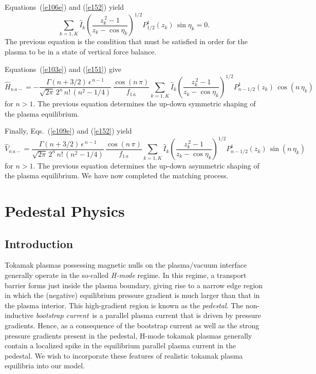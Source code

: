 \documentclass[12pt,prb,aps]{revtex4-1}
\begin{document}
Equations~(\ref{e106e}) and (\ref{e152}) yield
\begin{equation}\label{e165}
\sum_{k=1,K} 
\hat{I}_k\left(\frac{z_k^{\,2}-1}{z_k-\cos\eta_k}\right)^{1/2}P_{1/2}^1(z_k)\,\sin\eta_k=0.
\end{equation}
The previous equation is the condition that must be satisfied in order for the plasma to be in a state of vertical force balance. 

Equations~(\ref{e103e}) and (\ref{e151}) give
\begin{equation}\label{e166q}
\hat{H}_{n\,a-} = -\frac{\Gamma(n+3/2)\,\epsilon^{\,n-1}}{\sqrt{2\pi}\,2^n\,n!\,(n^2-1/4)}\,
\frac{\cos(n\,\pi)}{f_{1\,a}}\sum_{k=1,K}\hat{I}_k\left(\frac{z_k^{\,2}-1}{z_k-\cos\eta_k}\right)^{1/2}P_{n-1/2}^1(z_k)\,\cos(n\,\eta_k)
\end{equation}
for $n>1$. The previous equation determines the up-down symmetric shaping of the plasma equilibrium. 

Finally, Eqs.~(\ref{e109e}) and (\ref{e152}) yield
 \begin{equation}\label{e167q}
\hat{V}_{n\,a-} = \frac{\Gamma(n+3/2)\,\epsilon^{\,n-1}}{\sqrt{2\pi}\,2^n\,n!\,(n^2-1/4)}\,
\frac{\cos(n\,\pi)}{f_{1\,a}}\sum_{k=1,K}\hat{I}_k\left(\frac{z_k^{\,2}-1}{z_k-\cos\eta_k}\right)^{1/2}P_{n-1/2}^1(z_k)\,\sin(n\,\eta_k)
\end{equation}
for $n>1$. The previous equation determines the up-down asymmetric shaping of the plasma equilibrium. 
We have now completed the matching process. 

\section{Pedestal Physics}\label{sped}
\subsection{Introduction}
Tokamak plasmas  possessing magnetic nulls on the plasma/vacuum interface generally operate in the so-called {\em H-mode}\/ regime.\cite{wesson,hmode}
In this regime, a transport barrier forms just inside the plasma boundary, giving rise to a narrow edge region in which the (negative) equilibrium  pressure gradient
is much larger than that in the plasma interior. This high-gradient region is known as the {\em pedestal}. The non-inductive {\em bootstrap current}\,\cite{boot}
is a parallel  plasma current that is driven by pressure gradients.\cite{rf} Hence, as a consequence of the bootstrap current as well as the strong pressure gradients present in the pedestal,  H-mode
tokamak plasmas generally 
 contain a localized spike in the equilibrium parallel plasma current in the pedestal. We wish to incorporate these features of realistic tokamak
 plasma equilibria into our model. 
 
\end{document}
